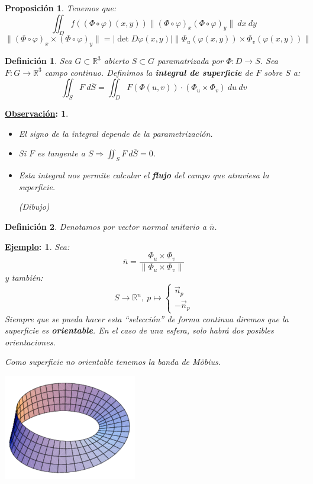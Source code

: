 \documentclass[10pt,a4paper,openright]{book}
\theoremstyle{break}
\newtheorem*{defi}{Definición}
\newtheorem*{prop}{Proposición}
\newtheorem*{obs}{\underline{Observación}:}
\newtheorem*{ej}{\underline{Ejemplo}:}
\newcommand{\dif}[1]{\ d#1}
\begin{document}
\begin{prop}
Tenemos que: 
$$\iint_{D} f\left( \left( \Phi \circ \varphi \right) \left( x, y \right) \right) \lVert \left( \Phi \circ \varphi \right)_x \left( \Phi \circ \varphi \right)_y \rVert \dif{x} \dif{y}$$
$$\lVert \left( \Phi \circ \varphi \right)_x \times \left( \Phi \circ \varphi \right)_y \rVert = \lvert \det D \varphi\left( x, y \right) \rvert \lVert \Phi_u \left( \varphi\left( x, y \right) \right) \times \Phi_v \left( \varphi\left( x, y \right) \right) \rVert$$
\end{prop}

\begin{defi}
Sea $G \subset \mathbb{R}^3$ abierto $S \subset G$ paramatrizada por $\Phi: D \rightarrow S$. Sea $F: G \rightarrow \mathbb{R}^3$ campo continuo. 
Definimos la \textbf{integral de superficie} de $F$ sobre $S$ a: 
$$\iint_{S} F \dif{\overline{S}} = \iint_{D} F\left( \Phi\left( u, v \right) \right) \cdot \left( \Phi_u \times \Phi_v \right) \dif{u} \dif{v}$$
\end{defi}

\begin{obs}
\begin{itemize}
    \item El signo de la integral depende de la parametrización.
    \item Si $F$ es tangente a $S \Rightarrow \iint_{S} F \dif{\overline{S}} = 0$. 
    \item Esta integral nos permite calcular el \textbf{flujo} del campo que atraviesa la superficie.
    
    (\textit{Dibujo})
\end{itemize}
\end{obs}

\begin{defi}
Denotamos por vector normal unitario a $\overline{n}$.
\end{defi}

\begin{ej}
Sea: 
$$\overline{n} = \frac{\Phi_u \times \Phi_v}{\lVert \Phi_u \times \Phi_v \rVert}$$
y también: 
$$S \rightarrow \mathbb{R}^n,\ p \mapsto \begin{cases}
    \vec{n}_p\\
    -\vec{n}_p
\end{cases} $$
Siempre que se pueda hacer esta ``selección'' de forma continua diremos que la superficie es \textbf{orientable}. En el caso de una esfera, solo habrá dos posibles orientaciones.

Como superficie no orientable tenemos la banda de Möbius.
\begin{center}
    \includegraphics[scale=0.3]{images/mobius} 
\end{center}
\end{ej}
\end{document}

